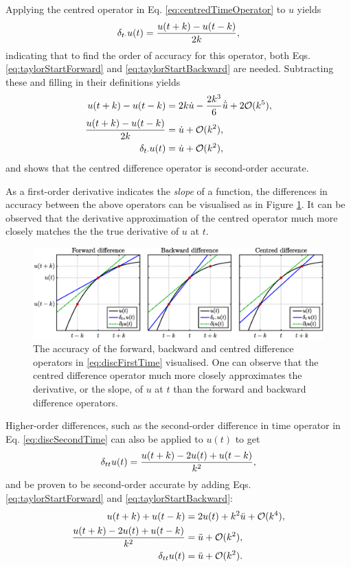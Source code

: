 Applying the centred operator in Eq. \eqref{eq:centredTimeOperator} to $u$ yields
\begin{equation}
    \delta_{t\cdot} u(t) = \frac{u(t+k) - u(t-k)}{2k},
\end{equation}
indicating that to find the order of accuracy for this operator, both Eqs. \eqref{eq:taylorStartForward} and \eqref{eq:taylorStartBackward} are needed. Subtracting these and filling in their definitions yields
\begin{align}
    u(t+k) - u(t-k) &= 2k\dot u - \frac{2k^3}{6}\dot{\ddot{u}} + 2\mathcal{O}(k^5),\nonumber\\
    \frac{u(t+k) - u(t-k)}{2k} &= \dot u + \mathcal{O}(k^2),\nonumber\\
    \delta_{t\cdot} u(t) &= \dot u + \mathcal{O}(k^2),
\end{align}
and shows that the centred difference operator is second-order accurate. 

As a first-order derivative indicates the \textit{slope} of a function, the differences in accuracy between the above operators can be visualised as in Figure \ref{fig:taylor}. It can be observed that the derivative approximation of the centred operator much more closely matches the the true derivative of $u$ at $t$.

\begin{figure}[h]
    \includegraphics[width=\textwidth]{figures/fdtd/taylor.eps}
    \caption{\label{fig:taylor} The accuracy of the forward, backward and centred difference operators in \eqref{eq:discFirstTime} visualised. One can observe that the centred difference operator much more closely approximates the derivative, or the slope, of $u$ at $t$ than the forward and backward difference operators.}
\end{figure}

Higher-order differences, such as the second-order difference in time operator in Eq. \eqref{eq:discSecondTime} can also be applied to $u(t)$ to get
\begin{equation}
    \delta_{tt} u(t) =  \frac{u(t+k) - 2u(t) + u(t-k)}{k^2},
\end{equation}
and be proven to be second-order accurate by adding Eqs. \eqref{eq:taylorStartForward} and \eqref{eq:taylorStartBackward}:
\begin{align}
    u(t+k) + u(t-k) &= 2 u(t) + k^2 \ddot u + \mathcal{O}(k^4),\nonumber\\
    \frac{u(t+k) -2 u(t) + u(t-k)}{k^2} &= \ddot u + \mathcal{O}(k^2),\nonumber\\
    \delta_{tt} u(t) &= \ddot u + \mathcal{O}(k^2).
\end{align}


